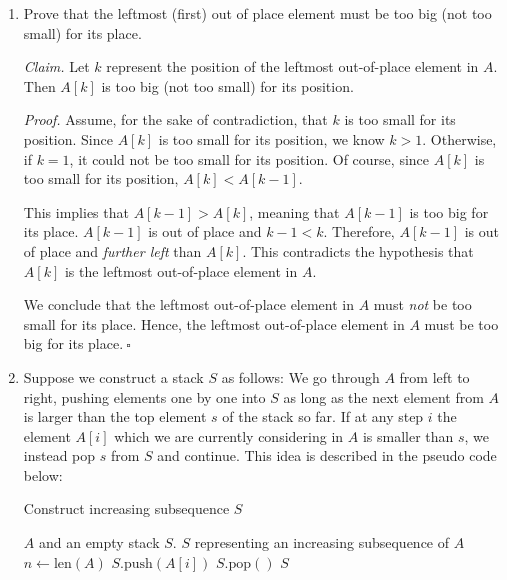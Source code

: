 \begin{enumerate}
    \item Prove that the leftmost (first) out of place element must be too big (not too small) for its place.
\begin{solution}
\textit{Claim. }Let $k$ represent the position of the leftmost out-of-place element in $A$. Then $A[k]$ is too big (not too small) for its position.

\textit{Proof. }Assume, for the sake of contradiction, that $k$ is too small for its position. Since $A[k]$ is too small for its position, we know $k>1$. Otherwise, if $k=1$, it could not be too small for its position. Of course, since $A[k]$ is too small for its position, $A[k]<A[k-1]$.

This implies that $A[k-1]>A[k]$, meaning that $A[k-1]$ is too big for its place. $A[k-1]$ is out of place and $k-1<k$. Therefore, $A[k-1]$ is out of place and \textit{further left} than $A[k]$. This contradicts the hypothesis that $A[k]$ is the leftmost out-of-place element in $A$.

We conclude that the leftmost out-of-place element in $A$ must \textit{not} be too small for its place. Hence, the leftmost out-of-place element in $A$ must be too big for its place.$~\square$
\end{solution}
    \item Suppose we construct a stack $S$ as follows: We go through $A$ from left to right, pushing elements one by one into $S$ as long as the next element from $A$ is larger than the top element $s$ of the stack so far. If at any step $i$ the element $A[i]$ which we are currently considering in $A$ is smaller than $s$, we instead pop $s$ from $S$ and continue.
    This idea is described in the pseudo code below:
    \begin{minipage}{\linewidth}
    \begin{algorithm}[H]
    \label{incsubseq}
    \caption{Construct increasing subsequence $S$}
    \begin{algorithmic}
    \REQUIRE $A$ and an empty stack $S$.
    \ENSURE $S$ representing an increasing subsequence of $A$
    \STATE $n \leftarrow \text{len}(A)$
        \STATE $S.\text{push}(A[i])$
        \ELSE 
        \STATE $S.\text{pop}()$
        \ENDIF
    \ENDFOR
    \STATE \RETURN $S$
    \end{algorithmic}
    \end{algorithm}
    \end{minipage}
    \smallskip
    

\end{enumerate}
